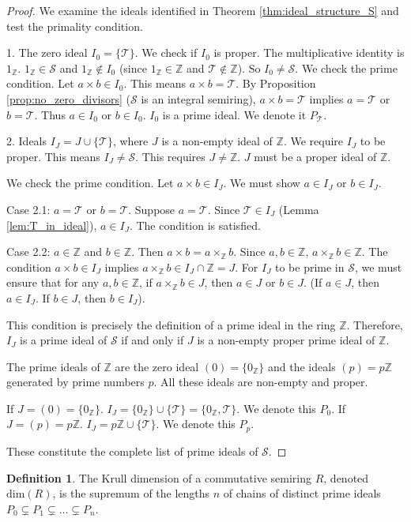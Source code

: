 \documentclass[11pt, a4paper]{article}
\theoremstyle{plain}
\theoremstyle{definition}
\newtheorem{definition}[theorem]{Definition}
\numberwithin{equation}{section}
\newcommand{\Z}{\mathbb{Z}}
\newcommand{\Tobj}{\mathcal{T}} %
\newcommand{\SemiringS}{\mathcal{S}}
\newcommand{\KrullDim}{\mathrm{dim}}
\begin{document}
\begin{proof}
We examine the ideals identified in Theorem \ref{thm:ideal_structure_S} and test the primality condition.

1. The zero ideal $I_0 = \{\Tobj\}$.
We check if $I_0$ is proper. The multiplicative identity is $1_{\Z}$. $1_{\Z} \in \SemiringS$ and $1_{\Z} \notin I_0$ (since $1_{\Z} \in \Z$ and $\Tobj \notin \Z$). So $I_0 \neq \SemiringS$.
We check the prime condition. Let $a\times b \in I_0$. This means $a\times b = \Tobj$.
By Proposition \ref{prop:no_zero_divisors} ($\SemiringS$ is an integral semiring), $a\times b = \Tobj$ implies $a=\Tobj$ or $b=\Tobj$.
Thus $a \in I_0$ or $b \in I_0$. $I_0$ is a prime ideal. We denote it $P_{\Tobj}$.

2. Ideals $I_J = J \cup \{\Tobj\}$, where $J$ is a non-empty ideal of $\Z$.
We require $I_J$ to be proper. This means $I_J \neq \SemiringS$. This requires $J \neq \Z$. $J$ must be a proper ideal of $\Z$.

We check the prime condition. Let $a\times b \in I_J$. We must show $a \in I_J$ or $b \in I_J$.

Case 2.1: $a=\Tobj$ or $b=\Tobj$. Suppose $a=\Tobj$. Since $\Tobj \in I_J$ (Lemma \ref{lem:T_in_ideal}), $a \in I_J$. The condition is satisfied.

Case 2.2: $a \in \Z$ and $b \in \Z$. Then $a\times b = a\times_{\Z} b$. Since $a, b \in \Z$, $a\times_{\Z} b \in \Z$.
The condition $a\times b \in I_J$ implies $a\times_{\Z} b \in I_J \cap \Z = J$.
For $I_J$ to be prime in $\SemiringS$, we must ensure that for any $a, b \in \Z$, if $a\times_{\Z} b \in J$, then $a \in J$ or $b \in J$. (If $a \in J$, then $a \in I_J$. If $b \in J$, then $b \in I_J$).

This condition is precisely the definition of a prime ideal in the ring $\Z$.
Therefore, $I_J$ is a prime ideal of $\SemiringS$ if and only if $J$ is a non-empty proper prime ideal of $\Z$.

The prime ideals of $\Z$ are the zero ideal $(0)=\{0_{\Z}\}$ and the ideals $(p)=p\Z$ generated by prime numbers $p$. All these ideals are non-empty and proper.

If $J=(0)=\{0_{\Z}\}$. $I_J = \{0_{\Z}\} \cup \{\Tobj\} = \{0_{\Z}, \Tobj\}$. We denote this $P_{0}$.
If $J=(p)=p\Z$. $I_J = p\Z \cup \{\Tobj\}$. We denote this $P_{p}$.

These constitute the complete list of prime ideals of $\SemiringS$.
\end{proof}

\begin{definition}
The Krull dimension of a commutative semiring $R$, denoted $\KrullDim(R)$, is the supremum of the lengths $n$ of chains of distinct prime ideals $P_0 \subsetneq P_1 \subsetneq \dots \subsetneq P_n$.
\end{definition}
\end{document}
